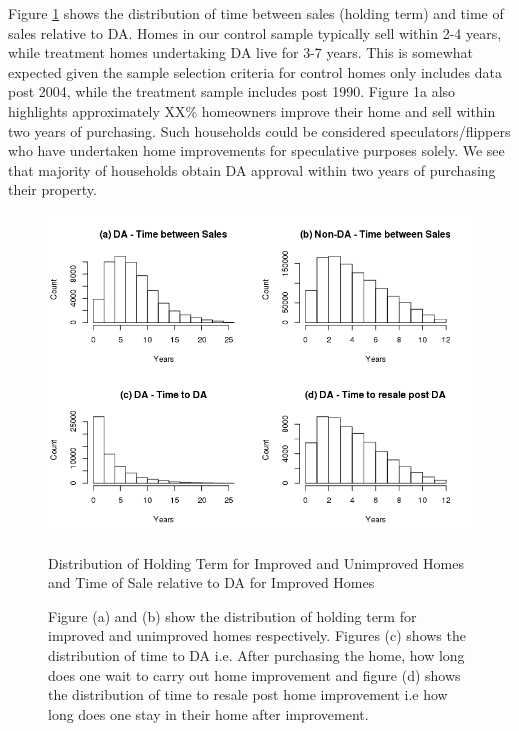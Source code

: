 \documentclass[AEJ,reqno, draftmode]{AEA} %
\begin{document}
  

Figure \ref{fig:Rplot_month_bet_sale_notional} shows the distribution of time between sales (holding term) and time of sales relative to DA. Homes in our control sample typically sell within 2-4 years, while treatment homes undertaking DA live for 3-7 years. This is somewhat expected given the sample selection criteria for control homes only includes data post 2004, while the treatment sample includes post 1990. Figure 1a also highlights approximately XX\% homeowners improve their home and sell within two years of purchasing. Such households could be considered speculators/flippers who have undertaken home improvements for speculative purposes solely. We see that majority of households obtain DA approval within two years of purchasing their property. 



\captionsetup[figure]{font=large,skip=0pt}

\begin{figure}[!htb]
    \centering
     \includegraphics[width=\columnwidth]{Figures/Time_bet_sale_notional2004_after_ACT_NT_Rplot.png} \par
 \caption{Distribution of Holding Term for Improved and Unimproved Homes and Time of Sale relative to DA for Improved Homes}
 \label{fig:Rplot_month_bet_sale_notional}
 \caption*{\small Figure (a) and (b) show the distribution of holding term for improved and unimproved homes respectively. Figures (c) shows the distribution of time to DA i.e. After purchasing the home, how long does one wait to carry out home improvement and figure (d) shows the distribution of time to resale post home improvement i.e how long does one stay in their home after improvement.}
  \vspace*{-\baselineskip}
 \end{figure}
\end{document}
